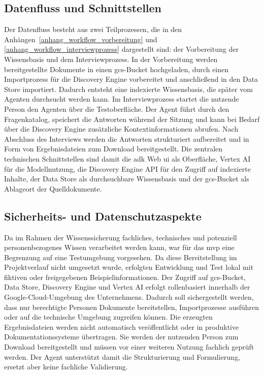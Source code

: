 \documentclass[
  10pt,
  ngerman,
  a4paper,
  toc=graduated,
  numbers=noenddot,
  headings=standardclasses,
  nonumberlist
]{scrartcl}
\begin{document}

\subsection{Datenfluss und Schnittstellen}
\label{datenfluss_und_schnittstellen}
Der Datenfluss besteht aus zwei Teilprozessen, die in den Anhängen~\ref{anhang_workflow_vorbereitung} und \ref{anhang_workflow_interviewprozess} dargestellt sind: der Vorbereitung der Wissensbasis und dem Interviewprozess. In der Vorbereitung werden bereitgestellte Dokumente in einen \gls{gcs}-Bucket hochgeladen, durch einen Importprozess für die Discovery Engine vorbereitet und anschließend in den Data Store importiert. Dadurch entsteht eine indexierte Wissensbasis, die später vom Agenten durchsucht werden kann.
Im Interviewprozess startet die nutzende Person den Agenten über die Testoberfläche. Der Agent führt durch den Fragenkatalog, speichert die Antworten während der Sitzung und kann bei Bedarf über die Discovery Engine zusätzliche Kontextinformationen abrufen. Nach Abschluss des Interviews werden die Antworten strukturiert aufbereitet und in Form von Ergebnisdateien zum Download bereitgestellt. Die zentralen technischen Schnittstellen sind damit die \gls{adk} Web \gls{ui} als Oberfläche, Vertex AI für die Modellnutzung, die Discovery Engine API für den Zugriff auf indexierte Inhalte, der Data Store als durchsuchbare Wissensbasis und der \gls{gcs}-Bucket als Ablageort der Quelldokumente.


\subsection{Sicherheits- und Datenschutzaspekte}
\label{sicherheits_und_datenschutzaspekte}

Da im Rahmen der Wissenssicherung fachliches, technisches und potenziell personenbezogenes Wissen verarbeitet werden kann, war für das \gls{mvp} eine Begrenzung auf eine Testumgebung vorgesehen. Da diese Bereitstellung im Projektverlauf nicht umgesetzt wurde, erfolgten Entwicklung und Test lokal mit fiktiven oder freigegebenen Beispielinformationen. Der Zugriff auf \gls{gcs}-Bucket, Data Store, Discovery Engine und Vertex AI erfolgt rollenbasiert innerhalb der Google-Cloud-Umgebung des Unternehmens. Dadurch soll sichergestellt werden, dass nur berechtigte Personen Dokumente bereitstellen, Importprozesse ausführen oder auf die technische Umgebung zugreifen können. Die erzeugten Ergebnisdateien werden nicht automatisch veröffentlicht oder in produktive Dokumentationssysteme übertragen. Sie werden der nutzenden Person zum Download bereitgestellt und müssen vor einer weiteren Nutzung fachlich geprüft werden. Der Agent unterstützt damit die Strukturierung und Formulierung, ersetzt aber keine fachliche Validierung.
\end{document}
